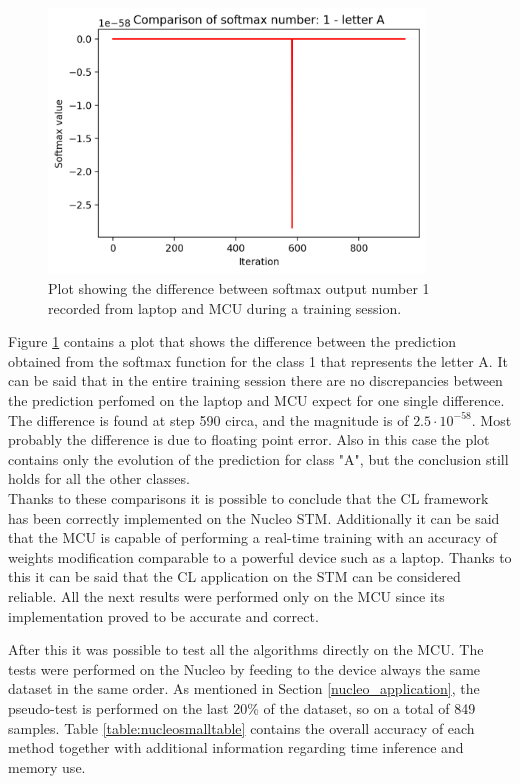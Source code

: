 \documentclass[12pt]{report}
\begin{document}
\begin{figure}[h!]
    \centering
    \includegraphics[width=100mm]{Figures/Chapter5/softmax_example.png} 
    \caption{Plot showing the difference between softmax output number 1 recorded from laptop and MCU during a training session.}
    \label{fig:comparison_softmax}    
\end{figure}

Figure \ref{fig:comparison_softmax} contains a plot that shows the difference between the prediction obtained from the softmax function for the class 1 that represents the letter A. It can be said that in the entire training session there are no discrepancies between the prediction perfomed on the laptop and MCU expect for one single difference. The difference is found at step 590 circa, and the magnitude is of $2.5 \cdot 10^{-58}$. Most probably the difference is due to floating point error. Also in this case the plot contains only the evolution of the prediction for class "A", but the conclusion still holds for all the other classes.\\
Thanks to these comparisons it is possible to conclude that the CL framework has been correctly implemented on the Nucleo STM. Additionally it can be said that the MCU is capable of performing a real-time training with an accuracy of weights modification comparable to a powerful device such as a laptop. Thanks to this it can be said that the CL application on the STM can be considered reliable. All the next results were performed only on the MCU since its implementation proved to be accurate and correct.\bigskip

After this it was possible to test all the algorithms directly on the MCU. The tests were performed on the Nucleo by feeding to the device always the same dataset in the same order. As mentioned in Section \ref{nucleo_application}, the pseudo-test is performed on the last 20\% of the dataset, so on a total of 849 samples. Table \ref{table:nucleosmalltable} contains the overall accuracy of each method together with additional information regarding time inference and memory use.
\end{document}
